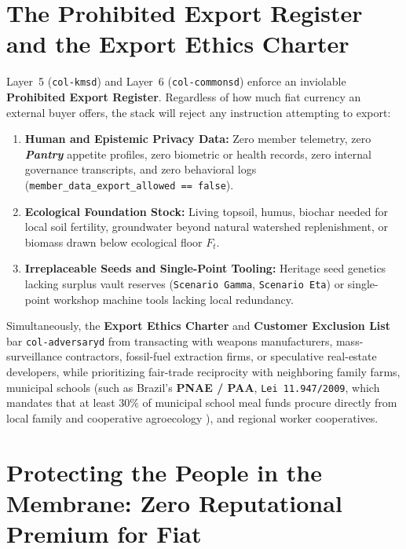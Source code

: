 \section{The Prohibited Export Register and the Export Ethics Charter}
\label{sec:l7-prohibited-exports}

Layer~5 (\texttt{col-kmsd}) and Layer~6 (\texttt{col-commonsd}) enforce an inviolable \textbf{Prohibited Export Register}. Regardless of how much fiat currency an external buyer offers, the stack will reject any instruction attempting to export:
\begin{enumerate}
    \item \textbf{Human and Epistemic Privacy Data:} Zero member telemetry, zero \textbf{\textit{Pantry}} appetite profiles, zero biometric or health records, zero internal governance transcripts, and zero behavioral logs (\texttt{member\_data\_export\_allowed == false}).
    \item \textbf{Ecological Foundation Stock:} Living topsoil, humus, biochar needed for local soil fertility, groundwater beyond natural watershed replenishment, or biomass drawn below ecological floor $F_t$.
    \item \textbf{Irreplaceable Seeds and Single-Point Tooling:} Heritage seed genetics lacking surplus vault reserves (\texttt{Scenario Gamma}, \texttt{Scenario Eta}) or single-point workshop machine tools lacking local redundancy.
\end{enumerate}

Simultaneously, the \textbf{Export Ethics Charter} and \textbf{Customer Exclusion List} bar \texttt{col-adversaryd} from transacting with weapons manufacturers, mass-surveillance contractors, fossil-fuel extraction firms, or speculative real-estate developers, while prioritizing fair-trade reciprocity with neighboring family farms, municipal schools (such as Brazil's \textbf{PNAE / PAA}, \texttt{Lei 11.947/2009}, which mandates that at least $30\%$ of municipal school meal funds procure directly from local family and cooperative agroecology \parencite{brazil_pnae2009}), and regional worker cooperatives.

\section{Protecting the People in the Membrane: Zero Reputational Premium for Fiat}
\label{sec:l7-people-in-membrane}

